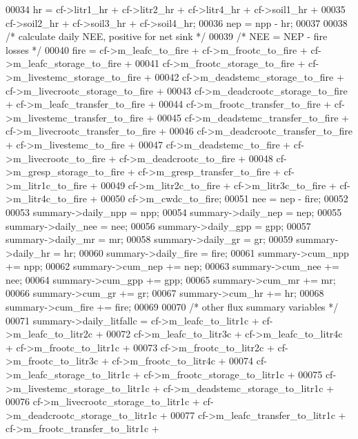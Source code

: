 \begin{DoxyCode}
00034     hr = cf->litr1\_hr + cf->litr2\_hr + cf->litr4\_hr + cf->soil1\_hr +
00035         cf->soil2\_hr + cf->soil3\_hr + cf->soil4\_hr;
00036     nep = npp - hr;
00037     
00038     \textcolor{comment}{/* calculate daily NEE, positive for net sink */}
00039     \textcolor{comment}{/* NEE = NEP - fire losses */}
00040     fire = cf->m\_leafc\_to\_fire + cf->m\_frootc\_to\_fire + cf->m\_leafc\_storage\_to\_fire +
00041         cf->m\_frootc\_storage\_to\_fire + cf->m\_livestemc\_storage\_to\_fire + 
00042         cf->m\_deadstemc\_storage\_to\_fire + cf->m\_livecrootc\_storage\_to\_fire +
00043         cf->m\_deadcrootc\_storage\_to\_fire + cf->m\_leafc\_transfer\_to\_fire +
00044         cf->m\_frootc\_transfer\_to\_fire +  cf->m\_livestemc\_transfer\_to\_fire + 
00045         cf->m\_deadstemc\_transfer\_to\_fire + cf->m\_livecrootc\_transfer\_to\_fire +
00046         cf->m\_deadcrootc\_transfer\_to\_fire + cf->m\_livestemc\_to\_fire +
00047         cf->m\_deadstemc\_to\_fire + cf->m\_livecrootc\_to\_fire + cf->m\_deadcrootc\_to\_fire +
00048         cf->m\_gresp\_storage\_to\_fire + cf->m\_gresp\_transfer\_to\_fire + cf->m\_litr1c\_to\_fire +
00049         cf->m\_litr2c\_to\_fire + cf->m\_litr3c\_to\_fire + cf->m\_litr4c\_to\_fire +
00050         cf->m\_cwdc\_to\_fire;
00051     nee = nep - fire;
00052     
00053     summary->daily\_npp = npp;
00054     summary->daily\_nep = nep;
00055     summary->daily\_nee = nee;
00056     summary->daily\_gpp = gpp;
00057     summary->daily\_mr = mr;
00058     summary->daily\_gr = gr;
00059     summary->daily\_hr = hr;
00060     summary->daily\_fire = fire;
00061     summary->cum\_npp += npp;
00062     summary->cum\_nep += nep;
00063     summary->cum\_nee += nee;
00064     summary->cum\_gpp += gpp;
00065     summary->cum\_mr += mr;
00066     summary->cum\_gr += gr;
00067     summary->cum\_hr += hr;
00068     summary->cum\_fire += fire;
00069     
00070     \textcolor{comment}{/* other flux summary variables */}
00071     summary->daily\_litfallc = cf->m\_leafc\_to\_litr1c + cf->m\_leafc\_to\_litr2c + 
00072         cf->m\_leafc\_to\_litr3c + cf->m\_leafc\_to\_litr4c + cf->m\_frootc\_to\_litr1c +
00073         cf->m\_frootc\_to\_litr2c + cf->m\_frootc\_to\_litr3c + cf->m\_frootc\_to\_litr4c +
00074         cf->m\_leafc\_storage\_to\_litr1c + cf->m\_frootc\_storage\_to\_litr1c +
00075         cf->m\_livestemc\_storage\_to\_litr1c + cf->m\_deadstemc\_storage\_to\_litr1c +
00076         cf->m\_livecrootc\_storage\_to\_litr1c + cf->m\_deadcrootc\_storage\_to\_litr1c +
00077         cf->m\_leafc\_transfer\_to\_litr1c + cf->m\_frootc\_transfer\_to\_litr1c +

\end{DoxyCode}
